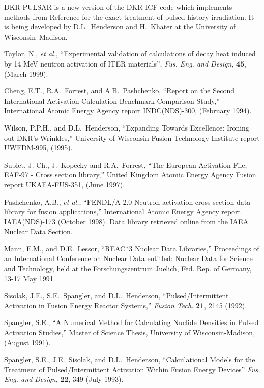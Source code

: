 \begin{thebibliography}{100}
 DKR-PULSAR is a new version of the DKR-ICF code which
  implements methods from Reference  for the exact
  treatment of pulsed history irradiation.  It is being developed by
  D.L.~Henderson and H.~Khater at the University of Wisconsin--Madison.
  
 Taylor, N., \textsl{et al.}, ``Experimental
  validation of calculations of decay heat induced by 14 MeV neutron
  activation of ITER materials'', \textsl{Fus. Eng. and Design},
  \textbf{45}, (March 1999).
  
 Cheng, E.T., R.A.~Forrest, and
  A.B.~Pashchenko, ``Report on the Second International Activation
  Calculation Benchmark Comparison Study,'' International Atomic
  Energy Agency report INDC(NDS)-300, (February 1994).
  
 Wilson, P.P.H., and D.L.~Henderson, ``Expanding
  Towards Excellence: Ironing out DKR's Wrinkles,'' University of
  Wisconsin Fusion Technology Institute report UWFDM-995, (1995).
  
 Sublet, J.-Ch., J.~Kopecky and R.A.~Forrest, ``The
  European Activation File, EAF-97 - Cross section library,'' United
  Kingdom Atomic Energy Agency Fusion report UKAEA-FUS-351, (June
  1997).
  
 Pashchenko, A.B., \textsl{et al.}, ``FENDL/A-2.0
  Neutron activation cross section data library for fusion
  applications,'' International Atomic Energy Agency report
  IAEA(NDS)-173 (October 1998).  Data library retrieved online from
  the IAEA Nuclear Data Section.

Mann, F.M., and D.E.~Lessor, ``REAC*3 Nuclear Data
  Libraries,'' Proceedings of an International Conference on Nuclear
  Data entitled: \underline{Nuclear Data for Science and Technology},
  held at the Forschungszentrum Juelich, Fed. Rep. of Germany, 13-17
  May 1991.

Sisolak, J.E., S.E.~Spangler, and D.L.~Henderson,
  ``Pulsed/Intermittent Activation in Fusion Energy Reactor Systems,''
  \textsl{Fusion Tech.} \textbf{21}, 2145 (1992).
  
 Spangler, S.E., ``A Numerical Method for
  Calculating Nuclide Densities in Pulsed Activation Studies,'' Master
  of Science Thesis, University of Wisconsin-Madison, (August 1991).
  
 Spangler, S.E., J.E.~Sisolak, and D.L.~Henderson,
  ``Calculational Models for the Treatment of Pulsed/Intermittent
  Activation Within Fusion Energy Devices'' \textsl{Fus. Eng. and
    Design}, \textbf{22}, 349 (July 1993).
  

\end{thebibliography}
